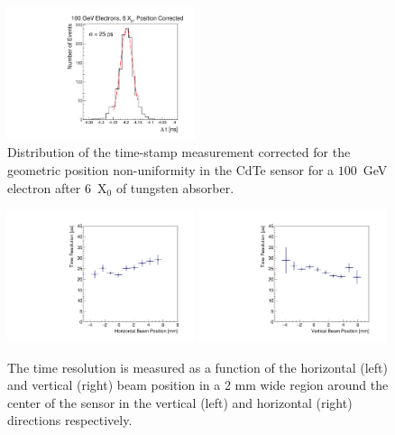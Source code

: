 \begin{figure}[htbp] 
\centering
\includegraphics[width=0.49\textwidth]{figures/CdTeTimingResolution_100GeV_PositionCorrected.pdf} 
\caption{Distribution of the time-stamp measurement corrected for the geometric position
non-uniformity in the CdTe sensor for a $100$~GeV electron after $6$~$\mathrm{X}_{0}$ of tungsten absorber. } 
\label{fig:DeltaTCorr} 
\end{figure} 



\begin{figure}[htbp] 
\centering
\includegraphics[width=0.49\textwidth]{figures/TimeResolutionVsBeamHorizontalPosition.pdf} 
\includegraphics[width=0.49\textwidth]{figures/TimeResolutionVsBeamVerticalPosition.pdf} 
\caption{ The time resolution is measured as a function of the horizontal (left) and vertical (right)
beam position in a 2 mm wide region around the center of the sensor in the vertical (left) 
and horizontal (right) directions respectively. }
\label{fig:TimeResolutionVsBeamXY} 
\end{figure} 


